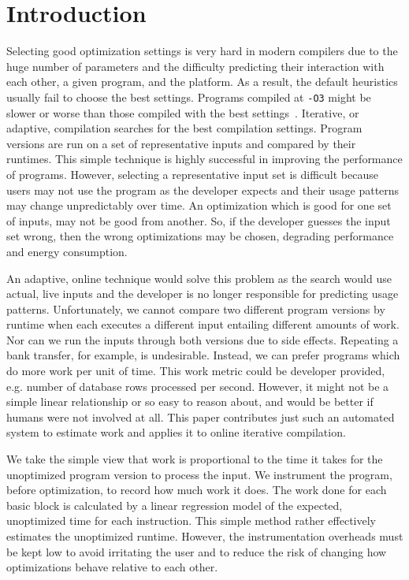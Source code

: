 \section{Introduction}

    Selecting good optimization settings is very hard in modern compilers due to the huge number of parameters and the difficulty
    predicting their interaction with each other, a given program, and the platform. As a result, the default heuristics usually fail to
    choose the best settings. Programs compiled at \texttt{-O3} might be  slower or worse than those compiled with the best
    settings~. Iterative, or adaptive, compilation searches for the best compilation settings. Program versions are run
    on a set of representative inputs and compared by their runtimes. This simple technique is highly successful in improving the
    performance of programs. However, selecting a representative input set is difficult because users may not use the program as the
    developer expects and their usage patterns may change unpredictably over time. An optimization which is good for one set of inputs, may
    not be good from another. So, if the developer guesses the input set wrong, then the wrong optimizations may be chosen, degrading
    performance and energy consumption.

    An adaptive, online technique would solve this problem as the search would use actual, live inputs and the developer is no longer
    responsible for predicting usage patterns. Unfortunately, we cannot compare two different program versions by runtime when each
    executes a different input entailing different amounts of work. Nor can we run the inputs through both versions due to side effects.
    Repeating a bank transfer, for example, is undesirable. Instead, we can prefer programs which do more work per unit of time. This work
    metric could be developer provided, e.g. number of database rows processed per second. However, it might not be a simple linear
    relationship or so easy to reason about, and would be better if humans were not involved at all. This paper contributes just such an
    automated system to estimate work and applies it to online iterative compilation.
    
    We take the simple view that work is proportional to the time it takes for the unoptimized program version to process the input. We
    instrument the program, before optimization, to record how much work it does. The work done for each basic block is calculated by a
    linear regression model of the expected, unoptimized time for each instruction. This simple method rather effectively estimates the
    unoptimized runtime. However, the instrumentation overheads must be kept low to avoid irritating the user and to reduce the risk of
    changing how optimizations behave relative to each other.

